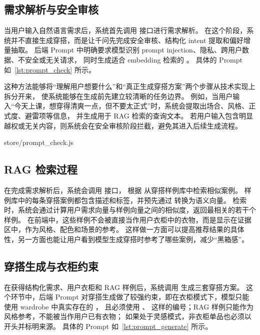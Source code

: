\documentclass{applemlr}
\begin{document}
\subsection{需求解析与安全审核}

当用户输入自然语言需求后，系统首先调用  接口进行需求解析。
在这个阶段，系统并不直接生成穿搭，而是让千问先完成安全审核、结构化 intent 提取和偏好增量抽取。
后端 Prompt 中明确要求模型识别 prompt injection、隐私、跨用户数据、不安全或无关请求，
同时生成适合 embedding 检索的  。
具体的 Prompt 如~\autoref{lst:prompt_check} 所示。

这种方法能够将“理解用户想要什么”和“真正生成穿搭方案”两个步骤从技术实现上拆分开来，
使系统能够在生成前先建立较清晰的任务边界。
例如，当用户输入“今天上课，想穿得清爽一点，但不要太正式”时，系统会提取出场合、风格、正式度、避雷项等信息，
并生成用于 RAG 检索的查询文本。
若用户输入包含明显越权或无关内容，则系统会在安全审核阶段拦截，避免其进入后续生成流程。

\vspace{0.8em}

{store/prompt_check.js}

\subsection{RAG 检索过程}

在完成需求解析后，系统会调用  接口，
根据  从穿搭样例库中检索相似案例。
样例库中的每条穿搭案例都包含描述和标签，并预先通过  转换为语义向量。
检索时，系统会通过计算用户需求向量与样例向量之间的相似度，返回最相关的若干个  样例。
在前端中，这些样例不会被直接当作用户衣柜中的衣物，而是显示在证据区中，作为风格、配色和场景的参考。
这样做一方面可以提高推荐结果的具体性，另一方面也能让用户看到模型生成穿搭时参考了哪些案例，减少“黑箱感”。

\subsection{穿搭生成与衣柜约束}

在获得结构化需求、用户衣柜和 RAG 样例后，系统调用  生成三套穿搭方案。
这个环节中，后端 Prompt 对穿搭生成做了较强约束，即在衣柜模式下，模型只能使用 wardrobe 中真实存在的 ，
且必须使用 、 这样的编号；RAG 样例只能作为风格参考，不能被当作用户已有衣物；
如果处于灵感模式，非衣柜单品也必须以  开头并标明来源。
具体的 Prompt 如~\autoref{lst:prompt_generate} 所示。
\end{document}

